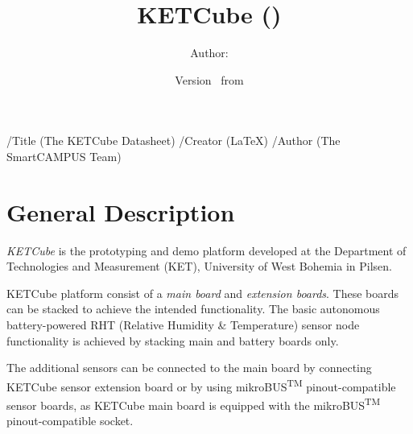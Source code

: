 

\pdfinfo
{
  /Title       (The KETCube Datasheet)
  /Creator     (LaTeX)
  /Author      (The SmartCAMPUS Team)
}

\title{\UWBLogo KETCube (\vhCurrentVersion)}

\author{Author: \vhListAllAuthorsLongWithAbbrev}
\date{Version \vhCurrentVersion\ from \vhCurrentDate}



\titlepage
\maketitle

\section*{General Description}
%
{\it KETCube} is the prototyping and demo platform developed at the Department of Technologies and Measurement (KET), University of West Bohemia in Pilsen. 

KETCube platform consist of a {\it main board} and {\it extension boards}.
These boards can be stacked to achieve the intended functionality. The basic autonomous battery-powered RHT (Relative Humidity \& Temperature) sensor node functionality is achieved by stacking main and battery boards only. 

The additional sensors can be connected to the main board by connecting KETCube sensor extension board or by using mikroBUS\textsuperscript{TM} pinout-compatible sensor boards, as KETCube main board is equipped with the mikroBUS\textsuperscript{TM} pinout-compatible socket.



